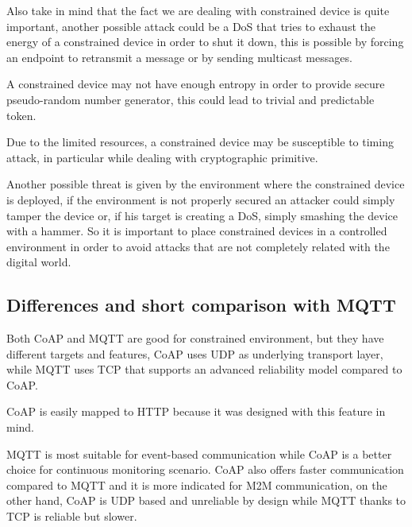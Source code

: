 	Also take in mind that the fact we are dealing with constrained device is quite important, another possible attack could be a DoS that tries to exhaust the energy of a constrained device in order to shut it down, this is possible by forcing an endpoint to retransmit a message or by sending multicast messages.\newline
	
	A constrained device may not have enough entropy in order to provide secure pseudo-random number generator, this could lead to trivial and predictable token.\newline
	
	Due to the limited resources, a constrained device may be susceptible to timing attack, in particular while dealing with cryptographic primitive.\newline
	
	Another possible threat is given by the environment where the constrained device is deployed, if the environment is not properly secured an attacker could simply tamper the device or, if his target is creating a DoS, simply smashing the device with a hammer.\newline
	So it is important to place constrained devices in a controlled environment in order to avoid attacks that are not completely related with the digital world.\newline
	
	\subsection{Differences and short comparison with MQTT}
	Both CoAP and MQTT are good for constrained environment, but they have different targets and features, CoAP uses UDP as underlying transport layer, while MQTT uses TCP that supports an advanced reliability model compared to CoAP.\newline
	
	CoAP is easily mapped to HTTP because it was designed with this feature in mind.\newline
	
	MQTT is most suitable for event-based communication while CoAP is a better choice for continuous monitoring scenario.\newline
	CoAP also offers faster communication compared to MQTT and it is more indicated for M2M communication, on the other hand, CoAP is UDP based and unreliable by design while MQTT thanks to TCP is reliable but slower.\newline
	
